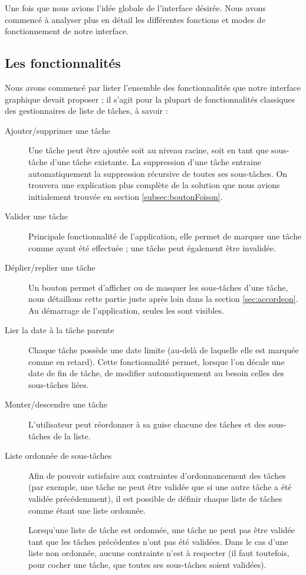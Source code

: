\documentclass[11pt]{article}
\begin{document}
Une fois que nous avions l'idée globale de l'interface désirée. Nous
avons commencé à analyser plus en détail les différentes fonctions et
modes de fonctionnement de notre interface.


\subsection{Les fonctionnalités}

Nous avons commencé par lister l'ensemble des fonctionnalités que
notre interface graphique devait proposer ; il s'agit pour la plupart
de fonctionnalités classiques des gestionnaires de liste de tâches, à
savoir :
\begin{description}
\item[Ajouter/supprimer une tâche] Une tâche peut être ajoutée soit au
  niveau racine, soit en tant que sous-tâche d'une tâche existante. La
  suppression d'une tâche entraine automatiquement la suppression
  récursive de toutes ses sous-tâches. On trouvera une explication
  plus complète de la solution que nous avions initialement trouvée en
  section \ref{subsec:boutonFoison}.
\item[Valider une tâche] Principale fonctionnalité de l'application,
  elle permet de marquer une tâche comme ayant été effectuée ; une
  tâche peut également être invalidée.
\item[Déplier/replier une tâche] Un bouton permet d'afficher ou de
  masquer les sous-tâches d'une tâche, nous détaillons cette partie
  juste après loin dans la section \ref{sec:accordeon}. Au démarrage
  de l'application, seules les  sont
  visibles.
\item[Lier la date à la tâche parente] Chaque tâche possède une date
  limite (au-delà de laquelle elle est marquée comme en retard). Cette
  fonctionnalité permet, lorsque l'on décale une date de fin de tâche,
  de modifier automatiquement au besoin celles des sous-tâches liées.
\item[Monter/descendre une tâche] L'utilisateur peut réordonner à sa
  guise chacune des tâches et des sous-tâches de la liste.
\item[Liste ordonnée de sous-tâches] Afin de pouvoir satisfaire aux
  contraintes d'ordonnancement des tâches (par exemple, une tâche ne
  peut être validée que si une autre tâche a été validée
  précédemment), il est possible de définir chaque liste de tâches
  comme étant une liste ordonnée.

  Lorsqu'une liste de tâche est ordonnée, une tâche ne peut pas être
  validée tant que les tâches précédentes n'ont pas été validées. Dans
  le cas d'une liste non ordonnée, aucune contrainte n'est à respecter
  (il faut toutefois, pour cocher une tâche, que toutes ses
  sous-tâches soient validées).
\end{description}
\end{document}
